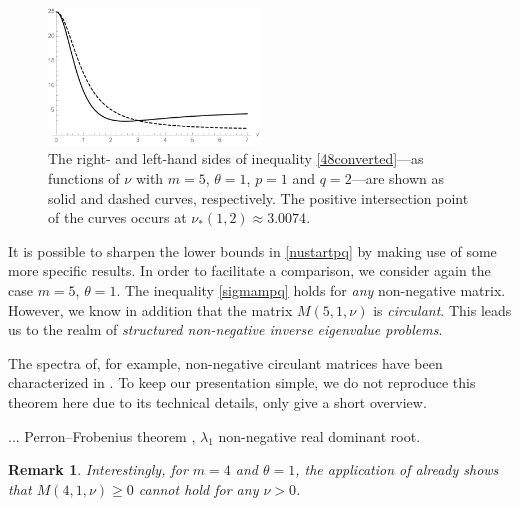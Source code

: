 \documentclass[a4paper]{article}
\newtheorem{remark}{Remark}
\newcommand{\te}{\theta}
\begin{document}
\begin{figure}
\begin{center}
\includegraphics[width=0.5\textwidth]{fig_eigenvalues1.pdf}
\caption{The right- and left-hand sides of inequality \eqref{48converted}---as functions of $\nu$ with $m=5$, $\te=1$, $p=1$ and $q=2$---are shown as solid and dashed curves, respectively. The positive intersection point of the curves occurs at $\nu_{*}(1,2)\approx 3.0074$.}\label{fig_eigen1}
\end{center}
\end{figure}

It is possible to sharpen the lower bounds in \eqref{nustartpq} by making use of some more specific results. 
In order to facilitate a comparison, we consider again the case $m=5$, $\te=1$. 
The inequality \eqref{sigmampq} holds for \emph{any} non-negative matrix. However, we know in addition that the matrix $M(5,1,\nu)$ is \emph{circulant}. This leads us to the realm of 
\emph{structured non-negative inverse eigenvalue problems}. 

The spectra of, for example, non-negative circulant matrices have been characterized in \cite[Theorem 10]{rojosoto}. To keep our
presentation simple, we do not reproduce this theorem here due to its technical details, only give a short
overview.

... Perron--Frobenius theorem \cite{nonnegmatr}, $\lambda_1$ non-negative real dominant root. 

\begin{remark}
Interestingly, for $m=4$ and $\te=1$, the application of \cite[Theorem 10]{rojosoto} already shows that $M(4,1,\nu)\ge 0$ cannot hold for any $\nu>0$.
\end{remark}
\end{document}
